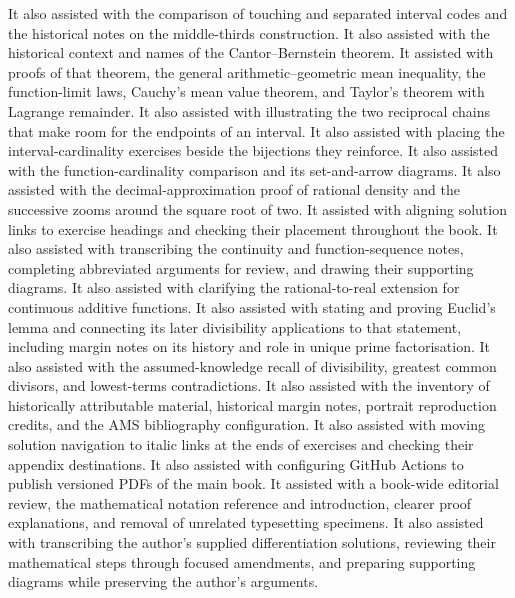 It also assisted with the comparison of touching and separated interval codes
and the historical notes on the middle-thirds construction.
It also assisted with the historical context and names of the
Cantor--Bernstein theorem.
It assisted with proofs of that theorem, the general arithmetic--geometric
mean inequality, the function-limit laws, Cauchy's mean value theorem, and
Taylor's theorem with Lagrange remainder.
It also assisted with illustrating the two reciprocal chains that make room
for the endpoints of an interval.
It also assisted with placing the interval-cardinality exercises beside
the bijections they reinforce.
It also assisted with the function-cardinality comparison and its
set-and-arrow diagrams.
It also assisted with the decimal-approximation proof of rational density
and the successive zooms around the square root of two.
It assisted with aligning solution links to exercise headings and checking
their placement throughout the book.
It also assisted with transcribing the continuity and function-sequence
notes, completing abbreviated arguments for review, and drawing their
supporting diagrams.
It also assisted with clarifying the rational-to-real extension for
continuous additive functions.
It also assisted with stating and proving Euclid's lemma and connecting
its later divisibility applications to that statement, including margin
notes on its history and role in unique prime factorisation.
It also assisted with the assumed-knowledge recall of divisibility,
greatest common divisors, and lowest-terms contradictions.
It also assisted with the inventory of historically attributable material,
historical margin notes, portrait reproduction credits, and the AMS
bibliography configuration.
It also assisted with moving solution navigation to italic links at the
ends of exercises and checking their appendix destinations.
It also assisted with configuring GitHub Actions to publish versioned PDFs
of the main book.
It assisted with a book-wide editorial review, the mathematical notation
reference and introduction, clearer proof explanations, and removal of
unrelated typesetting specimens.
It also assisted with transcribing the author's supplied differentiation
solutions, reviewing their mathematical steps through focused amendments,
and preparing supporting diagrams while preserving the author's arguments.
